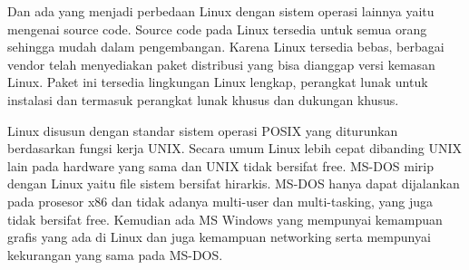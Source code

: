 Dan ada yang menjadi perbedaan Linux dengan sistem operasi lainnya yaitu mengenai source code. Source code pada Linux tersedia untuk semua orang sehingga mudah dalam pengembangan. Karena Linux tersedia bebas, berbagai vendor telah menyediakan paket distribusi yang bisa dianggap versi kemasan Linux. Paket ini tersedia lingkungan Linux lengkap, perangkat lunak untuk instalasi dan termasuk perangkat lunak khusus dan dukungan khusus.

Linux disusun dengan standar sistem operasi POSIX yang diturunkan berdasarkan fungsi kerja UNIX. Secara umum Linux lebih cepat dibanding UNIX lain pada hardware yang sama dan UNIX tidak bersifat free.
MS-DOS mirip dengan Linux yaitu file sistem bersifat hirarkis. MS-DOS hanya dapat dijalankan pada prosesor x86 dan tidak adanya multi-user dan multi-tasking, yang juga tidak bersifat free. Kemudian ada MS Windows yang mempunyai kemampuan grafis yang ada di Linux dan juga kemampuan networking serta mempunyai kekurangan yang sama pada MS-DOS.

